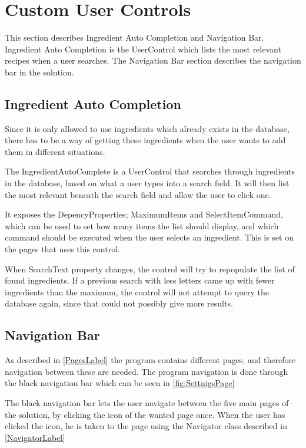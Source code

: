 \section{Custom User Controls}

This section describes Ingredient Auto Completion and Navigation Bar. Ingredient Auto Completion is the UserControl which lists the most relevant recipes when a user searches. The Navigation Bar section describes the navigation bar in the solution.

\subsection{Ingredient Auto Completion} \label{sec:AutoComplete}
Since it is only allowed to use ingredients which already exists in the database, there has to be a way of getting these ingredients when the user wants to add them in different situations.

The IngredientAutoComplete is a UserControl that searches through ingredients in the database, based on what a user types into a search field. It will then list the most relevant beneath the search field and allow the user to click one.

It exposes the DepencyProperties; MaximumItems and SelectItemCommand, which can be used to set how many items the list should display, and which command should be executed when the user selects an ingredient. This is set on the pages that uses this control.

When SearchText property changes, the control will try to repopulate the list of found ingredients. If a previous search with less letters came up with fewer ingredients than the maximum, the control will not attempt to query the database again, since that could not possibly give more results.

\subsection{Navigation Bar}\label{ssc:navBar}

As described in \cref{PagesLabel} the program contains different pages, and therefore navigation between these are needed. The program navigation is done through the black navigation bar which can be seen in \cref{fig:SettnigsPage}

The black navigation bar lets the user navigate between the five main pages of the solution, by clicking the icon of the wanted page once. When the user has clicked the icon, he is taken to the page using the Navigator class described in \cref{NavigatorLabel}